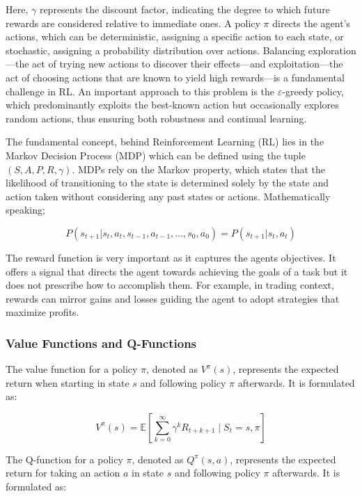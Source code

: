 Here, \( \gamma \) represents the discount factor, indicating the degree to which future rewards are considered relative to immediate ones. A policy \( \pi \) directs the agent's actions, which can be deterministic, assigning a specific action to each state, or stochastic, assigning a probability distribution over actions. Balancing exploration—the act of trying new actions to discover their effects—and exploitation—the act of choosing actions that are known to yield high rewards—is a fundamental challenge in RL. An important approach to this problem is the \(\varepsilon\)-greedy policy, which predominantly exploits the best-known action but occasionally explores random actions, thus ensuring both robustness and continual learning.

The fundamental concept, behind Reinforcement Learning (RL) lies in the Markov Decision Process (MDP) which can be defined using the tuple \( (S, A, P, R, \gamma) \). MDPs rely on the Markov property, which states that the likelihood of transitioning to the state is determined solely by the state and action taken without considering any past states or actions. Mathematically speaking;

\begin{equation}
\label{Equation:MarkovProperty}
P(s_{t+1} | s_t, a_t, s_{t-1}, a_{t-1}, \ldots, s_0, a_0) = P(s_{t+1} | s_t, a_t)
\end{equation}

The reward function is very important as it captures the agents objectives. It offers a signal that directs the agent towards achieving the goals of a task but it does not prescribe how to accomplish them. For example, in trading context, rewards can mirror gains and losses guiding the agent to adopt strategies that maximize profits.

\subsubsection{Value Functions and Q-Functions}
The value function for a policy \( \pi \), denoted as \( V^\pi(s) \), represents the expected return when starting in state \( s \) and following policy \( \pi \) afterwards. It is formulated as:

\begin{equation}
V^\pi(s) = \mathbb{E} \left[ \sum_{k=0}^{\infty} \gamma^k R_{t+k+1} \mid S_t = s, \pi \right]
\end{equation}

The Q-function for a policy \( \pi \), denoted as \( Q^\pi(s, a) \), represents the expected return for taking an action \( a \) in state \( s \) and following policy \( \pi \) afterwards. It is formulated as:

